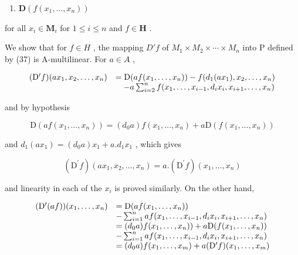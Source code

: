 \begin{enumerate}
\def\labelenumi{(\arabic{enumi})}
\setcounter{enumi}{36}
\tightlist
\item
  \(\mathbf{D}(f(x_1, \ldots, x_n))\)
\end{enumerate}

for all \(x_{i} \in \mathbf{M}_{i}\) for \(1 \leqslant i \leqslant n\) and \(f \in \mathbf{H}\) .

We show that for \(f \in H\) , the mapping \(D'f\) of \(M_{1} \times M_{2} \times \cdots \times M_{n}\) into P defined by (37) is A-multilinear. For \(a \in A\) ,

\[
\begin{array}{r l} (\mathrm{D} ^ {\prime} f) (a x _ {1}, x _ {2}, \ldots , x _ {n}) & = \mathrm{D} (a f (x _ {1}, \ldots , x _ {n})) - f (d _ {1} (a x _ {1}), x _ {2}, \ldots , x _ {n}) \\ & \quad - a \sum_ {i = 2} ^ {n} f (x _ {1}, \ldots , x _ {i - 1}, d _ {i} x _ {i}, x _ {i + 1}, \ldots , x _ {n}) \end{array}
\]

and by hypothesis

\[
\mathrm{D} (a f (x _ {1}, \dots , x _ {n})) = (d _ {0} a) f (x _ {1}, \dots , x _ {n}) + a \mathrm{D} (f (x _ {1}, \dots , x _ {n}))
\]

and \(d_{1}(ax_{1}) = (d_{0}a)x_{1} + a.d_{1}x_{1}\) , which gives

\[
(\mathrm{D} ^ {\prime} f) (a x _ {1}, x _ {2}, \dots , x _ {n}) = a. (\mathrm{D} ^ {\prime} f) (x _ {1}, \dots , x _ {n})
\]

and linearity in each of the \(x_{i}\) is proved similarly. On the other hand,

\[
\begin{array}{r l} (\mathrm{D} ^ {\prime} (a f)) (x _ {1}, \dots , x _ {n}) & = \mathrm{D} (a f (x _ {1}, \dots , x _ {n})) \\ & - \sum_ {i = 1} ^ {n} a f (x _ {1}, \dots , x _ {i - 1}, d _ {i} x _ {i}, x _ {i + 1}, \dots , x _ {n}) \\ & = (d _ {0} a) f (x _ {1}, \dots , x _ {n})) + a \mathrm{D} (f (x _ {1}, \dots , x _ {n})) \\ & - \sum_ {i = 1} ^ {n} a f (x _ {1}, \dots , x _ {i - 1}, d _ {i} x _ {i}, x _ {i + 1}, \dots , x _ {n}) \\ & = (d _ {0} a) f (x _ {1}, \dots , x _ {m}) + a (\mathrm{D} ^ {\prime} f) (x _ {1}, \dots , x _ {m}) \end{array}
\]

